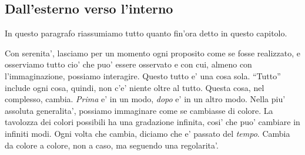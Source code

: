 %
%


%
%

\subsection{Dall'esterno verso l'interno}
\label{extInt}
In questo paragrafo riassumiamo tutto quanto fin'ora detto in questo capitolo.

Con serenita', lasciamo per un momento ogni proposito come se fosse realizzato, e osserviamo tutto cio' che puo' essere osservato e con cui, almeno con l'immaginazione, possiamo interagire. Questo tutto e' una cosa sola. ``Tutto'' include ogni cosa, quindi, non c'e' niente oltre al tutto.
Questa cosa, nel complesso, cambia. \emph{Prima} e' in un modo, \emph{dopo} e' in un altro modo. Nella piu' assoluta generalita', possiamo immaginare come se cambiasse di colore. La tavolozza dei colori possibili ha una gradazione infinita, cosi' che puo' cambiare in infiniti modi. Ogni volta che cambia, diciamo che e' passato del \emph{tempo}. Cambia da colore a colore, non a caso, ma seguendo una regolarita'. 

